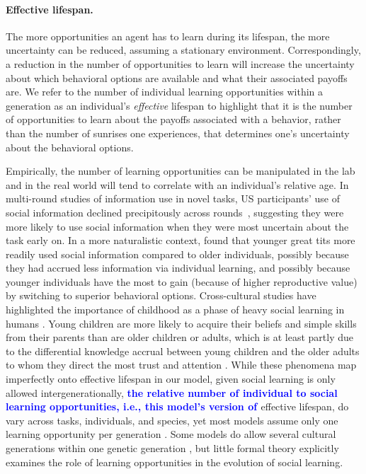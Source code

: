 \documentclass[letterpaper,11.5pt]{scrartcl}
\newcommand{\edit}[1]{{\bfseries \textcolor{blue} {#1}}}
\begin{document}
\paragraph{Effective lifespan.} The more opportunities an agent has to learn during its lifespan, the more uncertainty can be reduced, assuming a stationary environment. Correspondingly, a reduction in the number of opportunities to learn will increase the uncertainty about which behavioral options are available and what their associated
payoffs are. %
We refer to the number of individual learning opportunities within a generation as an individual's \emph{effective} lifespan to highlight that it is the number of opportunities to learn about the payoffs associated with a behavior, rather than the number of sunrises one experiences, that determines one's uncertainty about the behavioral options.  

Empirically, the number of learning opportunities can be manipulated in the lab and in the real world will tend to correlate with an individual's relative age. In multi-round studies of information use in novel tasks, US participants' use of social
information declined precipitously across rounds~\citep{McElreath2005}, suggesting
they were more likely to use social information when they were most uncertain about the task early on. In a more naturalistic context, \citet{Aplin2017} found that younger great tits more readily used social information compared to older individuals, possibly because they had accrued less information via individual learning, and possibly because younger individuals have the most to gain (because of higher reproductive value) by switching to superior behavioral options. Cross-cultural studies have highlighted the importance of childhood as a phase of heavy social learning in humans \citep{Reyes2016}. Young children are more likely to
acquire their beliefs and simple skills from their parents than are older children
or adults, which is at least partly due to the differential knowledge accrual
between young children and the older adults to whom they direct the most trust and
attention \citep{kline2013teaching}. While these phenomena map imperfectly onto effective lifespan in our model, given social learning is only allowed intergenerationally, \edit{the relative number of individual to social learning opportunities, i.e., this model's version of }effective lifespan, do vary across tasks, individuals, and species, yet most models assume only one learning opportunity per generation \citep{BoydRicherson1985, Feldman1996,Henrich1998, perreault2012bayesian}. Some models do allow several cultural generations within one genetic generation \citep{Enquist2007,Rendell2010,lindstrom2016co}, but little formal theory explicitly examines the role of learning opportunities in the evolution of social learning. 
\end{document}
